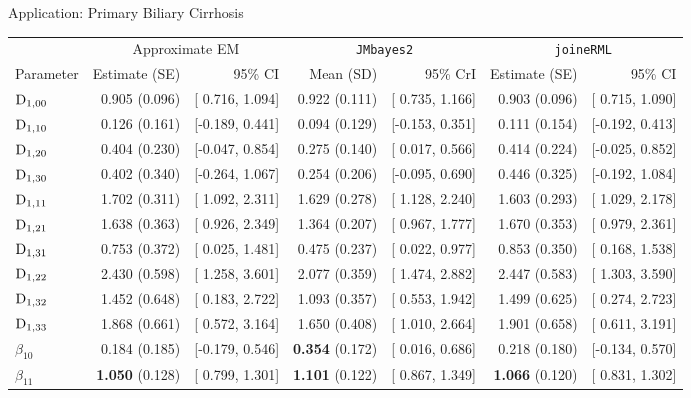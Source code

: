 \begin{chapter}{\label{cha:app-PBC}Application: Primary Biliary Cirrhosis}
  \begin{table}[ht]
  \centering
  \captionsetup{font=scriptsize}
  \begingroup\scriptsize
  \setlength{\tabcolsep}{3pt} %
  \begin{tabular}{lrrrrrr}
    & \multicolumn{2}{c}{Approximate EM} & \multicolumn{2}{c}{\tt{JMbayes2}} & \multicolumn{2}{c}{\tt{joineRML}}\\
    Parameter & Estimate (SE) & 95\% CI & Mean (SD) & 95\% CrI & Estimate (SE) & 95\% CI\\
    \hline
    $\mathrm{D}_{1,00}$ & 0.905 (0.096) & [ 0.716, 1.094] & 0.922 (0.111) & [ 0.735, 1.166] & 0.903 (0.096) & [ 0.715, 1.090] \\ 
    $\mathrm{D}_{1,10}$ & 0.126 (0.161) & [-0.189, 0.441] & 0.094 (0.129) & [-0.153, 0.351] & 0.111 (0.154) & [-0.192, 0.413] \\ 
    $\mathrm{D}_{1,20}$ & 0.404 (0.230) & [-0.047, 0.854] & 0.275 (0.140) & [ 0.017, 0.566] & 0.414 (0.224) & [-0.025, 0.852] \\ 
    $\mathrm{D}_{1,30}$ & 0.402 (0.340) & [-0.264, 1.067] & 0.254 (0.206) & [-0.095, 0.690] & 0.446 (0.325) & [-0.192, 1.084] \\ 
    $\mathrm{D}_{1,11}$ & 1.702 (0.311) & [ 1.092, 2.311] & 1.629 (0.278) & [ 1.128, 2.240] & 1.603 (0.293) & [ 1.029, 2.178] \\ 
    $\mathrm{D}_{1,21}$ & 1.638 (0.363) & [ 0.926, 2.349] & 1.364 (0.207) & [ 0.967, 1.777] & 1.670 (0.353) & [ 0.979, 2.361] \\ 
    $\mathrm{D}_{1,31}$ & 0.753 (0.372) & [ 0.025, 1.481] & 0.475 (0.237) & [ 0.022, 0.977] & 0.853 (0.350) & [ 0.168, 1.538] \\ 
    $\mathrm{D}_{1,22}$ & 2.430 (0.598) & [ 1.258, 3.601] & 2.077 (0.359) & [ 1.474, 2.882] & 2.447 (0.583) & [ 1.303, 3.590] \\ 
    $\mathrm{D}_{1,32}$ & 1.452 (0.648) & [ 0.183, 2.722] & 1.093 (0.357) & [ 0.553, 1.942] & 1.499 (0.625) & [ 0.274, 2.723] \\ 
    $\mathrm{D}_{1,33}$ & 1.868 (0.661) & [ 0.572, 3.164] & 1.650 (0.408) & [ 1.010, 2.664] & 1.901 (0.658) & [ 0.611, 3.191] \\ 
    $\beta_{10}$ &  0.184 (0.185) & [-0.179, 0.546] &  \textbf{0.354} (0.172) & [ 0.016, 0.686] &  0.218 (0.180) & [-0.134, 0.570] \\ 
    $\beta_{11}$ &  \textbf{1.050} (0.128) & [ 0.799, 1.301] &  \textbf{1.101} (0.122) & [ 0.867, 1.349] &  \textbf{1.066} (0.120) & [ 0.831, 1.302] \\ 

\end{tabular}
\end{table}
\end{chapter}

